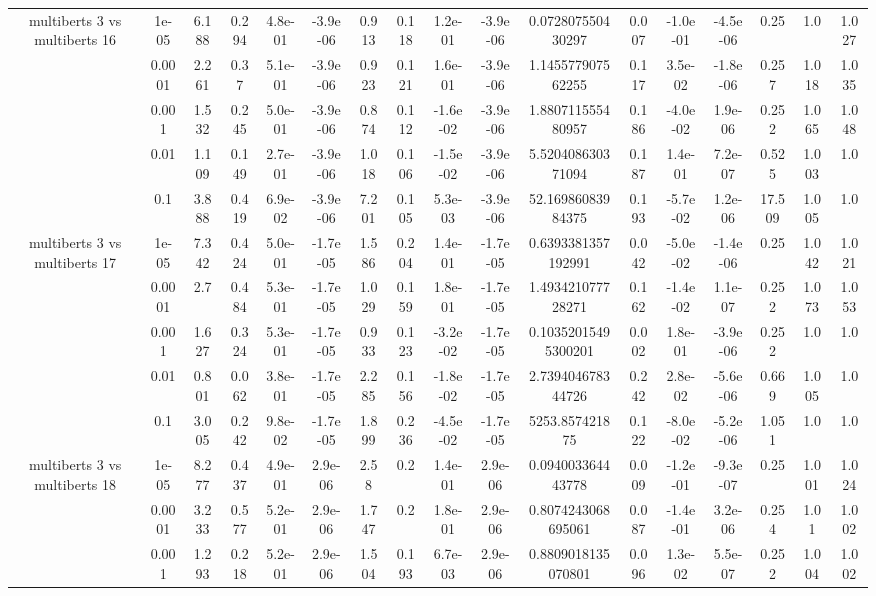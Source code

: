 \begin{tabular}{|c|c|c|c|c|c|c|c|c|c|c|c|c|c|c|c|c|}
\hline
\multirow{5}{*}{multiberts 3 vs multiberts 16} & 1e-05 & 6.188 & 0.294 & 4.8e-01 & -3.9e-06 & 0.913 & 0.118 & 1.2e-01 & -3.9e-06 & 0.072807550430297 & 0.007 & -1.0e-01 & -4.5e-06 & 0.25 & 1.0 & 1.027 \\
 & 0.0001 & 2.261 & 0.37 & 5.1e-01 & -3.9e-06 & 0.923 & 0.121 & 1.6e-01 & -3.9e-06 & 1.145577907562255 & 0.117 & 3.5e-02 & -1.8e-06 & 0.257 & 1.018 & 1.035 \\
 & 0.001 & 1.532 & 0.245 & 5.0e-01 & -3.9e-06 & 0.874 & 0.112 & -1.6e-02 & -3.9e-06 & 1.880711555480957 & 0.186 & -4.0e-02 & 1.9e-06 & 0.252 & 1.065 & 1.048 \\
 & 0.01 & 1.109 & 0.149 & 2.7e-01 & -3.9e-06 & 1.018 & 0.106 & -1.5e-02 & -3.9e-06 & 5.520408630371094 & 0.187 & 1.4e-01 & 7.2e-07 & 0.525 & 1.003 & 1.0 \\
 & 0.1 & 3.888 & 0.419 & 6.9e-02 & -3.9e-06 & 7.201 & 0.105 & 5.3e-03 & -3.9e-06 & 52.16986083984375 & 0.193 & -5.7e-02 & 1.2e-06 & 17.509 & 1.005 & 1.0 \\
\hline
\multirow{5}{*}{multiberts 3 vs multiberts 17} & 1e-05 & 7.342 & 0.424 & 5.0e-01 & -1.7e-05 & 1.586 & 0.204 & 1.4e-01 & -1.7e-05 & 0.6393381357192991 & 0.042 & -5.0e-02 & -1.4e-06 & 0.25 & 1.042 & 1.021 \\
 & 0.0001 & 2.7 & 0.484 & 5.3e-01 & -1.7e-05 & 1.029 & 0.159 & 1.8e-01 & -1.7e-05 & 1.493421077728271 & 0.162 & -1.4e-02 & 1.1e-07 & 0.252 & 1.073 & 1.053 \\
 & 0.001 & 1.627 & 0.324 & 5.3e-01 & -1.7e-05 & 0.933 & 0.123 & -3.2e-02 & -1.7e-05 & 0.10352015495300201 & 0.002 & 1.8e-01 & -3.9e-06 & 0.252 & 1.0 & 1.0 \\
 & 0.01 & 0.801 & 0.062 & 3.8e-01 & -1.7e-05 & 2.285 & 0.156 & -1.8e-02 & -1.7e-05 & 2.739404678344726 & 0.242 & 2.8e-02 & -5.6e-06 & 0.669 & 1.005 & 1.0 \\
 & 0.1 & 3.005 & 0.242 & 9.8e-02 & -1.7e-05 & 1.899 & 0.236 & -4.5e-02 & -1.7e-05 & 5253.857421875 & 0.122 & -8.0e-02 & -5.2e-06 & 1.051 & 1.0 & 1.0 \\
\hline
\multirow{5}{*}{multiberts 3 vs multiberts 18} & 1e-05 & 8.277 & 0.437 & 4.9e-01 & 2.9e-06 & 2.58 & 0.2 & 1.4e-01 & 2.9e-06 & 0.094003364443778 & 0.009 & -1.2e-01 & -9.3e-07 & 0.25 & 1.001 & 1.024 \\
 & 0.0001 & 3.233 & 0.577 & 5.2e-01 & 2.9e-06 & 1.747 & 0.2 & 1.8e-01 & 2.9e-06 & 0.8074243068695061 & 0.087 & -1.4e-01 & 3.2e-06 & 0.254 & 1.01 & 1.002 \\
 & 0.001 & 1.293 & 0.218 & 5.2e-01 & 2.9e-06 & 1.504 & 0.193 & 6.7e-03 & 2.9e-06 & 0.8809018135070801 & 0.096 & 1.3e-02 & 5.5e-07 & 0.252 & 1.004 & 1.002 \\

\end{tabular}
